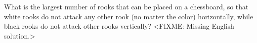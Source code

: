 \problem
What is the largest number of rooks that can be placed on a chessboard, so that
white rooks do not attack any other rook (no matter the color) horizontally,
while black rooks do not attack other rooks vertically?
\solution
<FIXME: Missing English solution.>
\endproblem

